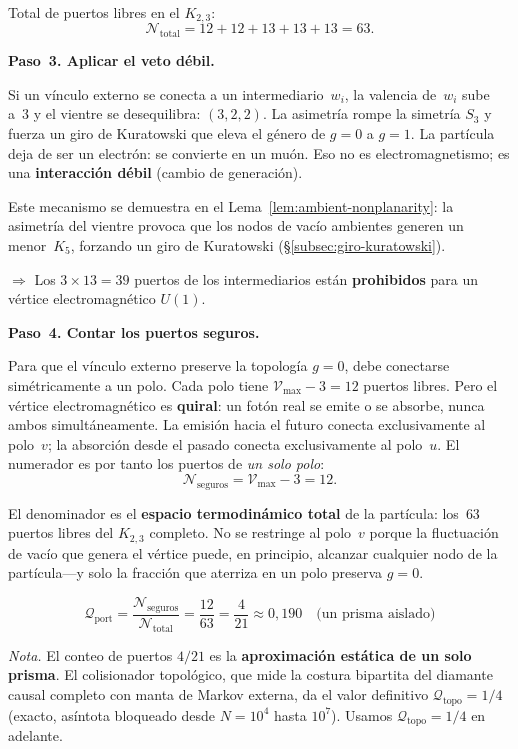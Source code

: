 \documentclass[11pt, a4paper, openany]{book}
\begin{document}
\smallskip
\noindent
Total de puertos libres en el $K_{2,3}$:
\[
  \mathcal{N}_{\text{total}} = 12 + 12 + 13 + 13 + 13 = 63.
\]

\bigskip
\noindent
\textbf{Paso~3. Aplicar el veto d\'ebil.}

Si un v\'inculo externo se conecta a un intermediario~$w_i$, la valencia
de~$w_i$ sube a~3 y el vientre se desequilibra: $(3, 2, 2)$. La asimetr\'ia
rompe la simetr\'ia $S_3$ y fuerza un giro de Kuratowski que eleva el
g\'enero de $g = 0$ a $g = 1$. La part\'icula deja de ser un electr\'on:
se convierte en un mu\'on. Eso no es electromagnetismo; es una
\textbf{interacci\'on d\'ebil} (cambio de generaci\'on).

Este mecanismo se demuestra en el
Lema~\ref{lem:ambient-nonplanarity}: la asimetr\'ia del vientre
provoca que los nodos de vac\'io ambientes generen un menor~$K_5$,
forzando un giro de Kuratowski
(\S\ref{subsec:giro-kuratowski}).

$\Longrightarrow$ Los $3 \times 13 = 39$ puertos de los intermediarios est\'an
\textbf{prohibidos} para un v\'ertice electromagn\'etico $U(1)$.

\bigskip
\noindent
\textbf{Paso~4. Contar los puertos seguros.}

Para que el v\'inculo externo preserve la topolog\'ia $g = 0$, debe
conectarse sim\'etricamente a un polo. Cada polo tiene
$\mathcal{V}_{\max} - 3 = 12$ puertos libres. Pero el v\'ertice
electromagn\'etico es \textbf{quiral}: un fot\'on real se emite o se
absorbe, nunca ambos simult\'aneamente. La emisi\'on hacia el futuro
conecta exclusivamente al polo~$v$; la absorci\'on desde el pasado
conecta exclusivamente al polo~$u$. El numerador es por tanto los
puertos de \emph{un solo polo}:
\[
  \mathcal{N}_{\text{seguros}} = \mathcal{V}_{\max} - 3 = 12.
\]

El denominador es el \textbf{espacio termodin\'amico total} de la
part\'icula: los~$63$ puertos libres del $K_{2,3}$ completo. No se
restringe al polo~$v$ porque la fluctuaci\'on de vac\'io que genera el
v\'ertice puede, en principio, alcanzar cualquier nodo de la
part\'icula---y solo la fracci\'on que aterriza en un polo preserva
$g = 0$.

\[
  \mathcal{Q}_{\mathrm{port}}
  = \frac{\mathcal{N}_{\text{seguros}}}{\mathcal{N}_{\text{total}}}
  = \frac{12}{63}
  = \frac{4}{21}
  \approx 0{,}190
  \quad\text{(un prisma aislado)}
\]

\noindent\textit{Nota.}\enspace
El conteo de puertos $4/21$ es la \textbf{aproximaci\'on est\'atica
de un solo prisma}. El colisionador topol\'ogico, que mide la costura
bipartita del diamante causal completo con manta de Markov externa,
da el valor definitivo $\mathcal{Q}_{\mathrm{topo}} = 1/4$ (exacto,
as\'intota bloqueado desde $N = 10^4$ hasta $10^7$).
Usamos $\mathcal{Q}_{\mathrm{topo}} = 1/4$ en adelante.
\end{document}
